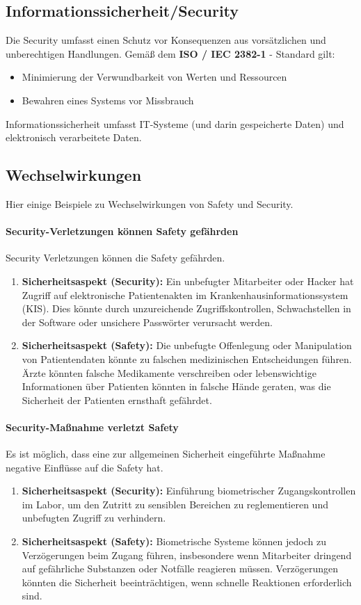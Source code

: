 \documentclass{book}
\begin{document}
\subsection{Informationssicherheit/Security}
Die Security umfasst einen Schutz vor Konsequenzen aus vorsätzlichen und unberechtigen Handlungen.
Gemäß dem \textbf{ ISO / IEC 2382-1} - Standard gilt:
\begin{itemize}
    \item Minimierung der Verwundbarkeit von Werten und Ressourcen
    \item Bewahren eines Systems vor Missbrauch
\end{itemize}
Informationssicherheit umfasst IT-Systeme (und darin gespeicherte Daten) und  elektronisch verarbeitete Daten.
\subsection{Wechselwirkungen}
Hier einige Beispiele zu Wechselwirkungen von Safety und Security.
\paragraph{Security-Verletzungen können Safety gefährden} Security Verletzungen können die Safety gefährden.
\begin{enumerate}[label=\arabic*.]
    \item \textbf{Sicherheitsaspekt (Security):} Ein unbefugter Mitarbeiter oder Hacker hat Zugriff auf elektronische Patientenakten im Krankenhausinformationssystem (KIS). Dies könnte durch unzureichende Zugriffskontrollen, Schwachstellen in der Software oder unsichere Passwörter verursacht werden.

    \item \textbf{Sicherheitsaspekt (Safety):} Die unbefugte Offenlegung oder Manipulation von Patientendaten könnte zu falschen medizinischen Entscheidungen führen. Ärzte könnten falsche Medikamente verschreiben oder lebenswichtige Informationen über Patienten könnten in falsche Hände geraten, was die Sicherheit der Patienten ernsthaft gefährdet.
\end{enumerate}
\paragraph{Security-Maßnahme verletzt Safety} Es ist möglich, dass eine zur allgemeinen Sicherheit eingeführte Maßnahme negative Einflüsse auf die Safety hat.
\begin{enumerate}[label=\arabic*.]
    \item \textbf{Sicherheitsaspekt (Security):} Einführung biometrischer Zugangskontrollen im Labor, um den Zutritt zu sensiblen Bereichen zu reglementieren und unbefugten Zugriff zu verhindern.

    \item \textbf{Sicherheitsaspekt (Safety):} Biometrische Systeme können jedoch zu Verzögerungen beim Zugang führen, insbesondere wenn Mitarbeiter dringend auf gefährliche Substanzen oder Notfälle reagieren müssen. Verzögerungen könnten die Sicherheit beeinträchtigen, wenn schnelle Reaktionen erforderlich sind.
\end{enumerate}
\end{document}
